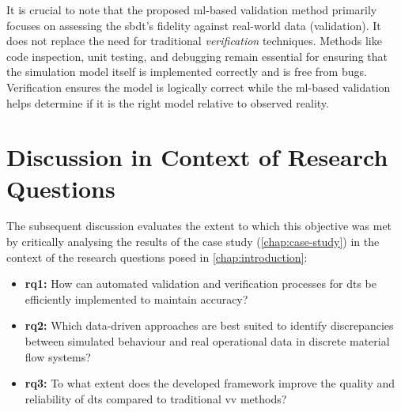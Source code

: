 It is crucial to note that the proposed \gls{ml}-based validation method primarily focuses on assessing the \gls{sbdt}'s fidelity against real-world data (validation). It does not replace the need for traditional \textit{verification} techniques. Methods like code inspection, unit testing, and debugging remain essential for ensuring that the simulation model itself is implemented correctly and is free from bugs. Verification ensures the model is logically correct while the \gls{ml}-based validation helps determine if it is the right model relative to observed reality.

\section{Discussion in Context of Research Questions}
\label{sec:discussion_rqs}
The subsequent discussion evaluates the extent to which this objective was met by critically analysing the results of the case study (\autoref{chap:case-study}) in the context of the research questions posed in \autoref{chap:introduction}:
\begin{itemize}
  \item \textbf{\gls{rq}1:} How can automated validation and verification processes for \gls{dt}s be efficiently implemented to maintain accuracy?
  \item \textbf{\gls{rq}2:} Which data-driven approaches are best suited to identify discrepancies between simulated behaviour and real operational data in discrete material flow systems?
  \item \textbf{\gls{rq}3:} To what extent does the developed framework improve the quality and reliability of \gls{dt}s compared to traditional \gls{vv} methods?
\end{itemize}

